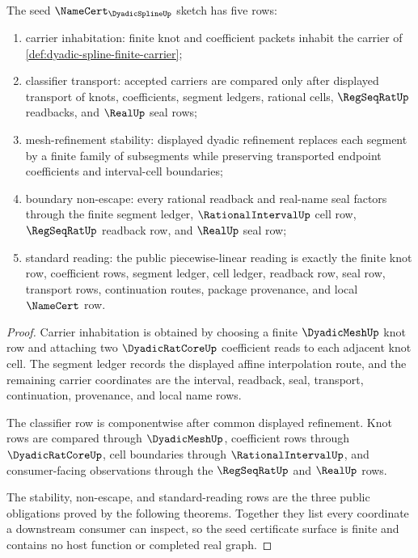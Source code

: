 \begin{theorem}
\label{thm:dyadic-spline-namecert-obligation-surface}
The seed $\NameCert_{\DyadicSplineUp}$ sketch has five rows:
\begin{enumerate}
\item carrier inhabitation: finite knot and coefficient packets inhabit the carrier of \autoref{def:dyadic-spline-finite-carrier};
\item classifier transport: accepted carriers are compared only after displayed transport of knots, coefficients, segment ledgers, rational cells, $\RegSeqRatUp$ readbacks, and $\RealUp$ seal rows;
\item mesh-refinement stability: displayed dyadic refinement replaces each segment by a finite family of subsegments while preserving transported endpoint coefficients and interval-cell boundaries;
\item boundary non-escape: every rational readback and real-name seal factors through the finite segment ledger, $\RationalIntervalUp$ cell row, $\RegSeqRatUp$ readback row, and $\RealUp$ seal row;
\item standard reading: the public piecewise-linear reading is exactly the finite knot row, coefficient rows, segment ledger, cell ledger, readback row, seal row, transport rows, continuation routes, package provenance, and local $\NameCert$ row.
\end{enumerate}
\end{theorem}
\begin{proof}
Carrier inhabitation is obtained by choosing a finite $\DyadicMeshUp$ knot row and attaching two $\DyadicRatCoreUp$ coefficient reads to each adjacent knot cell. The segment ledger records the displayed affine interpolation route, and the remaining carrier coordinates are the interval, readback, seal, transport, continuation, provenance, and local name rows.

The classifier row is componentwise after common displayed refinement. Knot rows are compared through $\DyadicMeshUp$, coefficient rows through $\DyadicRatCoreUp$, cell boundaries through $\RationalIntervalUp$, and consumer-facing observations through the $\RegSeqRatUp$ and $\RealUp$ rows.

The stability, non-escape, and standard-reading rows are the three public obligations proved by the following theorems. Together they list every coordinate a downstream consumer can inspect, so the seed certificate surface is finite and contains no host function or completed real graph.
\end{proof}

